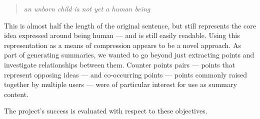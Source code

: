     \medskip
    \begin{center}
    \blockquote{\textit{an unborn child is not yet a human being}}
    \end{center}
    \medskip

    This is almost half the length of the original sentence, but still represents the core idea expressed around being human --- and is still easily readable. Using this representation as a means of compression appears to be a novel approach. As part of generating summaries, we wanted to go beyond just extracting points and investigate relationships between them. Counter points pairs --- points that represent opposing ideas --- and co-occurring points --- points commonly raised together by multiple users --- were of particular interest for use as summary content.

    \medskip

    The project's success is evaluated with respect to these objectives.
